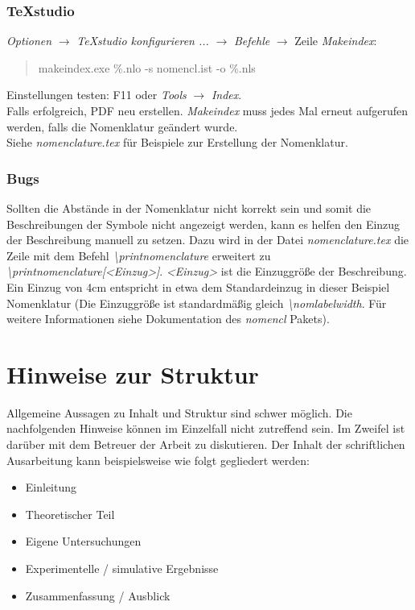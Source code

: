 \subsubsection{TeXstudio}
\textit{Optionen} $\rightarrow$ \textit{TeXstudio konfigurieren ...} $\rightarrow$ \textit{Befehle} $\rightarrow$ Zeile \textit{Makeindex}:
\begin{quotation}
makeindex.exe \%.nlo -s nomencl.ist -o \%.nls 
\end{quotation}

\noindent Einstellungen testen: F11 oder \textit{Tools} $\rightarrow$ \textit{Index}. \\
Falls erfolgreich, PDF neu erstellen. \textit{Makeindex} muss jedes Mal erneut aufgerufen werden, falls die Nomenklatur geändert wurde. \\
Siehe \textit{nomenclature.tex} für Beispiele zur Erstellung der Nomenklatur.

\subsubsection{Bugs}

Sollten die Abstände in der Nomenklatur nicht korrekt sein und somit die Beschreibungen der Symbole nicht angezeigt werden, kann es helfen den Einzug der Beschreibung manuell zu setzen. Dazu wird in der Datei \textit{nomenclature.tex} die Zeile mit dem Befehl \textit{\textbackslash printnomenclature} erweitert zu \textit{\textbackslash printnomenclature[<Einzug>]}. \textit{<Einzug>} ist die Einzuggröße der Beschreibung. Ein Einzug von 4cm entspricht in etwa dem Standardeinzug in dieser Beispiel Nomenklatur (Die Einzuggröße ist standardmäßig gleich \textit{\textbackslash nomlabelwidth}. Für weitere Informationen siehe Dokumentation des \textit{nomencl} Pakets). 


\section{Hinweise zur Struktur}
\label{hinweise:struktur}

Allgemeine Aussagen zu Inhalt und Struktur sind schwer möglich. Die nachfolgenden Hinweise können im Einzelfall nicht zutreffend sein. Im Zweifel ist darüber mit dem Betreuer der Arbeit zu diskutieren.
Der Inhalt der schriftlichen Ausarbeitung kann beispielsweise wie
folgt gegliedert werden:

\begin{itemize}
	\item Einleitung
	\item Theoretischer Teil
	\item Eigene Untersuchungen
	\item Experimentelle / simulative Ergebnisse
	\item Zusammenfassung / Ausblick
\end{itemize}

